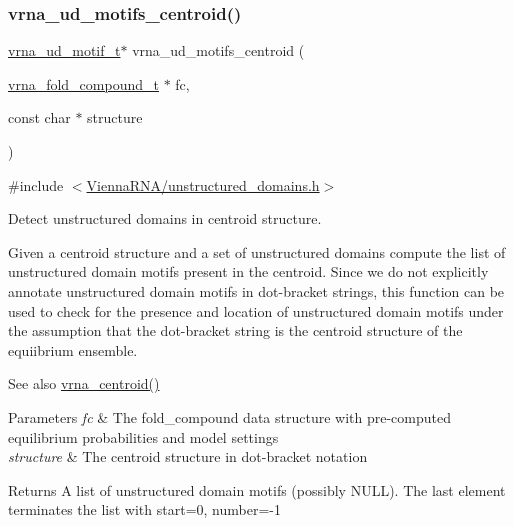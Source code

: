 \subsubsection{\texorpdfstring{vrna\_ud\_motifs\_centroid()}{vrna\_ud\_motifs\_centroid()}}
{\footnotesize\ttfamily \mbox{\hyperlink{structvrna__unstructured__domain__motif__s}{vrna\+\_\+ud\+\_\+motif\+\_\+t}}$\ast$ vrna\+\_\+ud\+\_\+motifs\+\_\+centroid (\begin{DoxyParamCaption}\item[{\mbox{\hyperlink{group__fold__compound_ga1b0cef17fd40466cef5968eaeeff6166}{vrna\+\_\+fold\+\_\+compound\+\_\+t}} $\ast$}]{fc,  }\item[{const char $\ast$}]{structure }\end{DoxyParamCaption})}



{\ttfamily \#include $<$\mbox{\hyperlink{unstructured__domains_8h}{Vienna\+R\+N\+A/unstructured\+\_\+domains.\+h}}$>$}



Detect unstructured domains in centroid structure. 

Given a centroid structure and a set of unstructured domains compute the list of unstructured domain motifs present in the centroid. Since we do not explicitly annotate unstructured domain motifs in dot-\/bracket strings, this function can be used to check for the presence and location of unstructured domain motifs under the assumption that the dot-\/bracket string is the centroid structure of the equiibrium ensemble.

\begin{DoxySeeAlso}{See also}
\mbox{\hyperlink{group__centroid__fold_ga0e64bb67e51963dc71cbd4d30b80a018}{vrna\+\_\+centroid()}}
\end{DoxySeeAlso}

\begin{DoxyParams}{Parameters}
{\em fc} & The fold\+\_\+compound data structure with pre-\/computed equilibrium probabilities and model settings \\
\hline
{\em structure} & The centroid structure in dot-\/bracket notation \\
\hline
\end{DoxyParams}
\begin{DoxyReturn}{Returns}
A list of unstructured domain motifs (possibly N\+U\+LL). The last element terminates the list with {\ttfamily start=0}, {\ttfamily number=-\/1} 
\end{DoxyReturn}
\mbox{\label{group__domains__up_ga980126e9f350b64474b35f20fce2782c}} 

